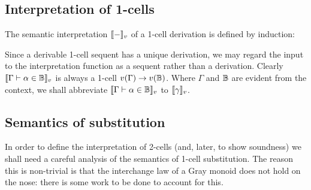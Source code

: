 \documentclass{robinthesisdraft}
\begin{document}
\subsection{Interpretation of 1-cells}
The semantic interpretation $\semint-$ of a 1-cell
derivation is defined by induction:
\begin{itemize}
\item $\Bigl\llbracket	\begin{prooftree}
	\justifies A\in\C \proves A\in\C \using (\C)
\end{prooftree} \Bigr\rrbracket_{v} = 1_{v(\C)}$,
\item $\left\llbracket\begin{prooftree}
		\[[\pi_{1}]\justifies\Gamma_{1}\proves \alpha_{1}\in \A_{1}\]
		\quad\cdots\quad
		\[[\pi_{n}]\justifies\Gamma_{n}\proves \alpha_{n}\in \A_{n}\]
		\justifies
		\Gamma_{1},\dots,\Gamma_{n} \proves f(\alpha_{1},\dots,\alpha_{n})\in\CB
		\using f(\bullet)
	\end{prooftree}\right\rrbracket_{v}$
	\newline\vskip1ex\strut\hfil$= v(f)\o\Bigl(
	\biggl\llbracket\begin{prooftree}
		[\pi_{1}]\justifies\Gamma_{1}\proves \alpha_{1}\in \A_{1}
	\end{prooftree}\biggr\rrbracket_{v}
	\tn\cdots\tn
	\biggl\llbracket\begin{prooftree}
		[\pi_{n}]\justifies\Gamma_{n}\proves \alpha_{n}\in \A_{n}
	\end{prooftree}\biggr\rrbracket_{v}
	\Bigr)$.
\end{itemize}
Since a derivable 1-cell sequent has a unique derivation, we may
regard the input to the interpretation function as a sequent rather
than a derivation. Clearly $\semint{\Gamma\proves \alpha\in\CB}$
is always a 1-cell $v(\Gamma)\to v(\mathbb{B})$.
%
Where $\Gamma$ and $\mathbb{B}$ are evident from the context, we shall
abbreviate $\semint{\Gamma\proves \alpha\in\CB}$ to $\semint{\gamma}$.

\subsection{Semantics of substitution}\label{s-semantics-of-substitution}
In order to define the interpretation of 2-cells (and, later, to
show soundness) we shall need a careful analysis of the semantics
of 1-cell substitution. The reason this is non-trivial is that the
interchange law of a Gray monoid does not hold on the nose: there
is some work to be done to account for this.
\end{document}
